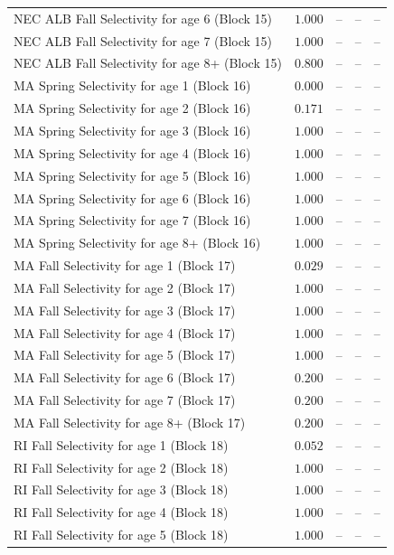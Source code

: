 \documentclass[
]{article}
\begin{document}
\begin{landscape}
\begin{longtable}[t]{lrrrr}
NEC ALB Fall Selectivity for age 6 (Block 15) & $1.000$ & -- & -- & --\\
NEC ALB Fall Selectivity for age 7 (Block 15) & $1.000$ & -- & -- & --\\
\addlinespace
NEC ALB Fall Selectivity for age 8+ (Block 15) & $0.800$ & -- & -- & --\\
MA Spring Selectivity for age 1 (Block 16) & $0.000$ & -- & -- & --\\
MA Spring Selectivity for age 2 (Block 16) & $0.171$ & -- & -- & --\\
MA Spring Selectivity for age 3 (Block 16) & $1.000$ & -- & -- & --\\
MA Spring Selectivity for age 4 (Block 16) & $1.000$ & -- & -- & --\\
\addlinespace
MA Spring Selectivity for age 5 (Block 16) & $1.000$ & -- & -- & --\\
MA Spring Selectivity for age 6 (Block 16) & $1.000$ & -- & -- & --\\
MA Spring Selectivity for age 7 (Block 16) & $1.000$ & -- & -- & --\\
MA Spring Selectivity for age 8+ (Block 16) & $1.000$ & -- & -- & --\\
MA Fall Selectivity for age 1 (Block 17) & $0.029$ & -- & -- & --\\
\addlinespace
MA Fall Selectivity for age 2 (Block 17) & $1.000$ & -- & -- & --\\
MA Fall Selectivity for age 3 (Block 17) & $1.000$ & -- & -- & --\\
MA Fall Selectivity for age 4 (Block 17) & $1.000$ & -- & -- & --\\
MA Fall Selectivity for age 5 (Block 17) & $1.000$ & -- & -- & --\\
MA Fall Selectivity for age 6 (Block 17) & $0.200$ & -- & -- & --\\
\addlinespace
MA Fall Selectivity for age 7 (Block 17) & $0.200$ & -- & -- & --\\
MA Fall Selectivity for age 8+ (Block 17) & $0.200$ & -- & -- & --\\
RI Fall Selectivity for age 1 (Block 18) & $0.052$ & -- & -- & --\\
RI Fall Selectivity for age 2 (Block 18) & $1.000$ & -- & -- & --\\
RI Fall Selectivity for age 3 (Block 18) & $1.000$ & -- & -- & --\\
\addlinespace
RI Fall Selectivity for age 4 (Block 18) & $1.000$ & -- & -- & --\\
RI Fall Selectivity for age 5 (Block 18) & $1.000$ & -- & -- & --\\

\end{longtable}
\end{landscape}
\end{document}
